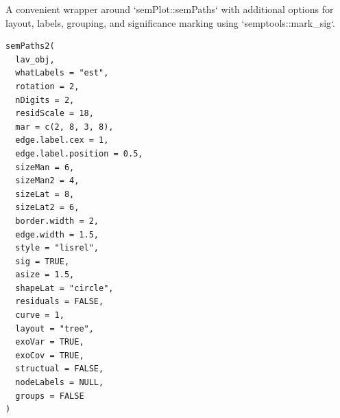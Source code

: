 \documentclass[a4paper]{book}
\begin{document}
%
\begin{Description}
A convenient wrapper around `semPlot::semPaths` with additional options for layout, labels,
grouping, and significance marking using `semptools::mark\_sig`.
\end{Description}
%
\begin{Usage}
\begin{verbatim}
semPaths2(
  lav_obj,
  whatLabels = "est",
  rotation = 2,
  nDigits = 2,
  residScale = 18,
  mar = c(2, 8, 3, 8),
  edge.label.cex = 1,
  edge.label.position = 0.5,
  sizeMan = 6,
  sizeMan2 = 4,
  sizeLat = 8,
  sizeLat2 = 6,
  border.width = 2,
  edge.width = 1.5,
  style = "lisrel",
  sig = TRUE,
  asize = 1.5,
  shapeLat = "circle",
  residuals = FALSE,
  curve = 1,
  layout = "tree",
  exoVar = TRUE,
  exoCov = TRUE,
  structual = FALSE,
  nodeLabels = NULL,
  groups = FALSE
)
\end{verbatim}
\end{Usage}
%
\end{document}
